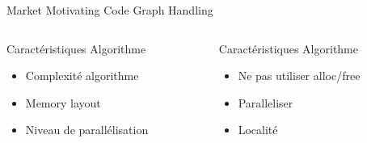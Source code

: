 %
\begin{Frame}{Market Motivating Code Graph Handling}
  \begin{columns}[t]
    \begin{column}{\HW} %
      \begin{block}{Caractéristiques Algorithme}
        \begin{itemize}
        \item Complexité algorithme
        \item Memory layout
        \item Niveau de parallélisation
        \end{itemize}
      \end{block} 
    \end{column}
    
    \begin{column}{\HW} %
      \begin{block}{Caractéristiques Algorithme}
        \begin{itemize}
        \item Ne pas utiliser alloc/free
        \item Paralleliser
        \item Localité
        \end{itemize}
      \end{block} 
    \end{column}
  \end{columns}  
\end{Frame}


